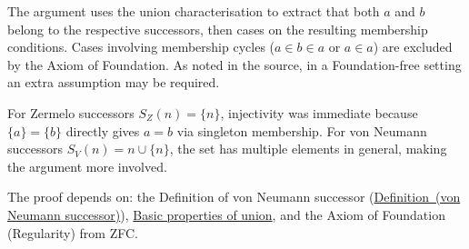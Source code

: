 \begin{remark*}
The argument uses the union characterisation to extract that both $a$ and $b$
belong to the respective successors, then cases on the resulting membership
conditions. Cases involving membership cycles ($a \in b \in a$ or $a \in a$)
are excluded by the Axiom of Foundation. As noted in the source, in a
Foundation-free setting an extra assumption may be required.
\end{remark*}

\begin{remark*}
For Zermelo successors $S_Z(n) = \{n\}$, injectivity was immediate because
$\{a\} = \{b\}$ directly gives $a = b$ via singleton membership. For von
Neumann successors $S_V(n) = n \cup \{n\}$, the set has multiple elements in
general, making the argument more involved.
\end{remark*}

\begin{remark*}[Dependencies]
The proof depends on: the Definition of von Neumann successor
(\hyperref[def:vn-successor]{Definition~(von Neumann successor)}),
\hyperref[prop:union-basics]{Basic properties of union}, and the Axiom of
Foundation (Regularity) from ZFC.
\end{remark*}
